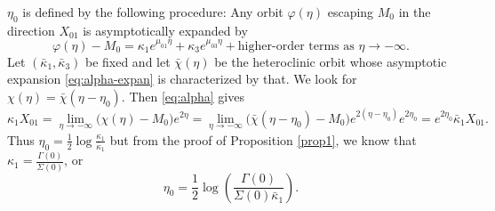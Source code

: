 \documentclass[a4paper,11pt]{article}
\theoremstyle{remark}
\begin{document}
$\eta_0$ is defined by the following procedure:  Any orbit $\varphi(\eta)$ escaping $M_0$ in the direction $X_{01}$ is asymptotically expanded by %
 \begin{equation}\label{eq:alpha-expan}
  \varphi(\eta) - M_0 = \kappa_1 e^{\mu_{01}\eta} + \kappa_3 e^{\mu_{03}\eta} + \text{higher-order terms as $\eta \rightarrow -\infty$}.
 \end{equation}
Let $(\bar\kappa_1,\bar\kappa_3)$ be fixed and let $\bar\chi(\eta)$ be the heteroclinic orbit whose asymptotic expansion \eqref{eq:alpha-expan} is characterized by that. We look for $\chi(\eta) = \bar\chi(\eta-\eta_0)$. Then \eqref{eq:alpha} gives
$$\kappa_1 X_{01}=\lim_{\eta \rightarrow -\infty}\big(\chi(\eta) - M_0\big)e^{2\eta} = \lim_{\eta \rightarrow -\infty} \big(\bar\chi(\eta-\eta_0) - M_0\big)e^{2(\eta-\eta_0)}e^{2\eta_0} = e^{2\eta_0}\bar\kappa_1 X_{01}.$$
Thus $\eta_0 = \frac{1}{2}\log {\frac{\kappa_1}{\bar\kappa_1}}$ but from the proof of Proposition \ref{prop1}, we know that
$\kappa_1 = \frac{\Gamma(0)}{\Sigma(0)}$, or
\begin{equation}
 \eta_0 = \frac{1}{2}\log \left(\frac{\Gamma(0)}{\Sigma(0)\bar\kappa_1}\right).%
\end{equation}
\end{document}
